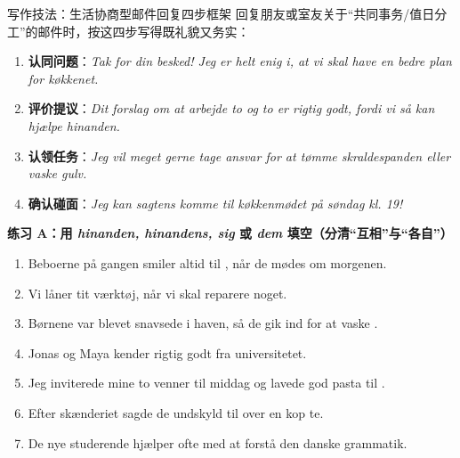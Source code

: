 \begin{grammatikbox}{写作技法：生活协商型邮件回复四步框架}
回复朋友或室友关于“共同事务/值日分工”的邮件时，按这四步写得既礼貌又务实：
\begin{enumerate}
  \item \textbf{认同问题}：\textit{Tak for din besked! Jeg er helt enig i, at vi skal have en bedre plan for køkkenet.}
  \item \textbf{评价提议}：\textit{Dit forslag om at arbejde to og to er rigtig godt, fordi vi så kan hjælpe hinanden.}
  \item \textbf{认领任务}：\textit{Jeg vil meget gerne tage ansvar for at tømme skraldespanden eller vaske gulv.}
  \item \textbf{确认碰面}：\textit{Jeg kan sagtens komme til køkkenmødet på søndag kl. 19!}
\end{enumerate}
\end{grammatikbox}


\textbf{练习 A：用 \textit{hinanden, hinandens, sig} 或 \textit{dem} 填空（分清“互相”与“各自”）}
\begin{enumerate}
  \item Beboerne på gangen smiler altid til \underline{\hspace{2.0cm}}, når de mødes om morgenen.
  \item Vi låner tit \underline{\hspace{2.0cm}} værktøj, når vi skal reparere noget.
  \item Børnene var blevet snavsede i haven, så de gik ind for at vaske \underline{\hspace{2.0cm}}.
  \item Jonas og Maya kender \underline{\hspace{2.0cm}} rigtig godt fra universitetet.
  \item Jeg inviterede mine to venner til middag og lavede god pasta til \underline{\hspace{2.0cm}}.
  \item Efter skænderiet sagde de undskyld til \underline{\hspace{2.0cm}} over en kop te.
  \item De nye studerende hjælper ofte \underline{\hspace{2.0cm}} med at forstå den danske grammatik.
\end{enumerate}

